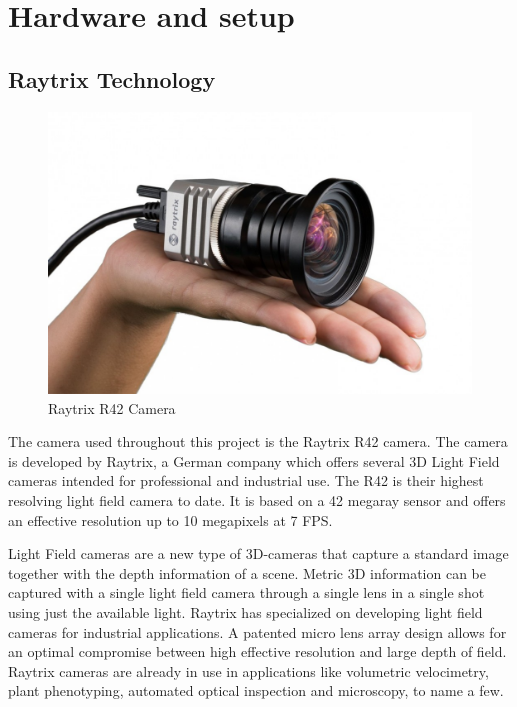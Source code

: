 \section{Hardware and setup}

\subsection{Raytrix Technology}\label{the_raytrix_camera}

\begin{figure}[ht]
    \centering
    \includegraphics[width=.9\linewidth]{images/introduction/raytrix_camera}
    \caption{Raytrix R42 Camera}
    \label{fig:raytrix_camera}
\end{figure}

The camera used throughout this project is the Raytrix R42 camera. The camera is developed by Raytrix, a German company which offers several 3D Light Field cameras intended for professional and industrial use. The R42 is their highest resolving light field camera to date. It is based on a 42 megaray sensor and offers an effective resolution up to 10 megapixels at 7 FPS. \cite{website:raytrix_r42}

Light Field cameras are a new type of 3D-cameras that capture a standard image together with the depth information of a scene. Metric 3D information can be captured with a single light field camera through a single lens in a single shot using just the available light. Raytrix has specialized on developing light field cameras for industrial applications. A patented micro lens array design allows for an optimal compromise between high effective resolution and large depth of field. Raytrix cameras are already in use in applications like volumetric velocimetry, plant phenotyping, automated optical inspection and microscopy, to name a few. \cite{website:raytrix_main}

